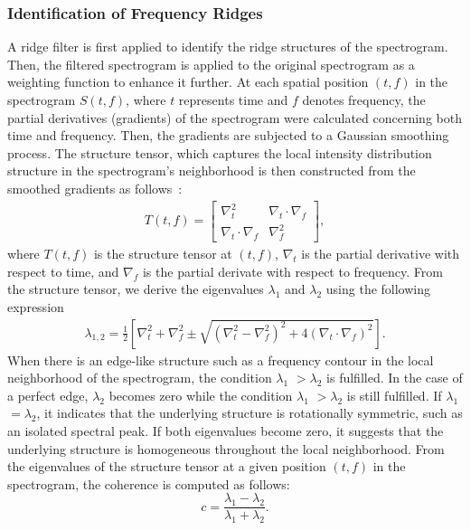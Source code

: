 \documentclass[applsci,article,accept,moreauthors,pdftex]{Definitions/mdpi}
\begin{document}
\subsubsection{Identification of Frequency Ridges}
A ridge filter is first applied to identify the ridge structures of the spectrogram. Then, the filtered spectrogram is applied to the original spectrogram as a weighting function to enhance it further. At each spatial position $(t, f)$ in the spectrogram $S(t, f)$, where $t$ represents time and $f$ denotes frequency, the partial derivatives (gradients) of the spectrogram were calculated concerning both time and frequency. Then, the gradients are subjected to a Gaussian smoothing process. The structure tensor, which captures the local intensity distribution structure in the spectrogram's neighborhood is then constructed from the smoothed gradients as follows~\cite{zeppelzauer2015towards}:
\begin{align}
	T(t, f) =
	\begin{bmatrix}
		\nabla_t^2 & \nabla_t \cdot \nabla_f  \\
		\nabla_t \cdot \nabla_f  & \nabla_f^2
	\end{bmatrix},
\end{align}
where $T(t, f)$ is the structure tensor at $(t,f)$, $\nabla_t$  is the partial derivative with respect to time, and $\nabla_f$ is the partial derivate with respect to frequency. From the structure tensor, we derive the eigenvalues $\lambda_1$ and $\lambda_2$ using the following expression
\begin{eqnarray}
	\lambda_{1,2}=\frac{1}{2}\left[\nabla_t^2 +\nabla_f^2 \pm \sqrt{(\nabla_t^2-\nabla_f^2)^2 + 4(\nabla_t \cdot \nabla_f)^2}\right].
\end{eqnarray}
When there is an edge-like structure such as a frequency contour in the local neighborhood of the spectrogram, the condition $\lambda_1$  $ >\lambda_2$ is fulfilled. In the case of a perfect edge, $\lambda_2$ becomes zero while the condition $\lambda_1$  $ >\lambda_2$  is still fulfilled. If  $\lambda_1$  $ =\lambda_2$, it indicates that the underlying structure is rotationally symmetric, such as an isolated spectral peak. If both eigenvalues become zero, it suggests that the underlying structure is homogeneous throughout the local neighborhood.
From the eigenvalues of the structure tensor at a given position $(t,f)$ in the spectrogram, the coherence is computed as follows:
\begin{equation}
	c = \frac{\lambda_1-\lambda_2}{\lambda_1+\lambda_2}.
\end{equation}
\end{document}
